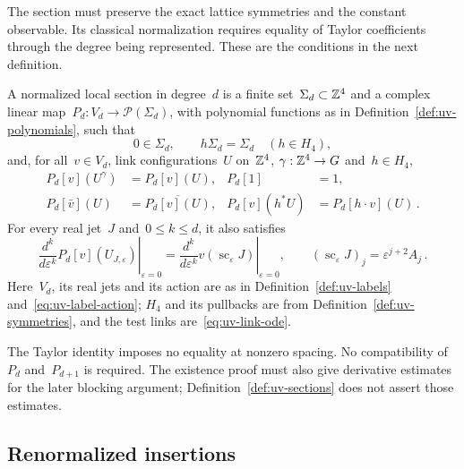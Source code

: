 The section must preserve the exact lattice symmetries and the constant observable.
Its classical normalization requires equality of Taylor coefficients through the degree being represented.
These are the conditions in the next definition.

\begin{definition}\label{def:uv-sections}
A normalized local section in degree~$d$ is a finite set~$\Sigma_d\subset\mathbb Z^4$ and a complex linear map~$P_d:V_d\to\mathcal P(\Sigma_d)$, with polynomial functions as in Definition~\ref{def:uv-polynomials}, such that
\begin{equation}\label{eq:uv-section-support}
 0\in\Sigma_d,\qquad h\Sigma_d=\Sigma_d\quad(h\in H_4),
\end{equation}
and, for all~$v\in V_d$, link configurations~$U$ on~$\mathbb Z^4$, $\gamma:\mathbb Z^4\to G$ and~$h\in H_4$,
\begin{equation}\label{eq:uv-section-symmetry}
 \begin{aligned}
 P_d[v](U^\gamma)&=P_d[v](U), & P_d[1]&=1,\\
 P_d[\bar v](U)&=\overline{P_d[v](U)}, &
 P_d[v](h^*U)&=P_d[h\cdot v](U)\,.
 \end{aligned}
\end{equation}
For every real jet~$J$ and~$0\le k\le d$, it also satisfies
\begin{equation}\label{eq:uv-section-taylor}
 \left.\frac{d^k}{d\varepsilon^k}P_d[v](U_{J,\varepsilon})\right|_{\varepsilon=0}
 =\left.\frac{d^k}{d\varepsilon^k}v(\operatorname{sc}_\varepsilon J)\right|_{\varepsilon=0},
 \qquad (\operatorname{sc}_\varepsilon J)_j=\varepsilon^{j+2}A_j\,.
\end{equation}
Here~$V_d$, its real jets and its action are as in Definition~\ref{def:uv-labels} and~\eqref{eq:uv-label-action}; $H_4$ and its pullbacks are from Definition~\ref{def:uv-symmetries}, and the test links are~\eqref{eq:uv-link-ode}.
\end{definition}

The Taylor identity imposes no equality at nonzero spacing.
No compatibility of~$P_d$ and~$P_{d+1}$ is required.
The existence proof must also give derivative estimates for the later blocking argument; Definition~\ref{def:uv-sections} does not assert those estimates.

\subsection{Renormalized insertions}

